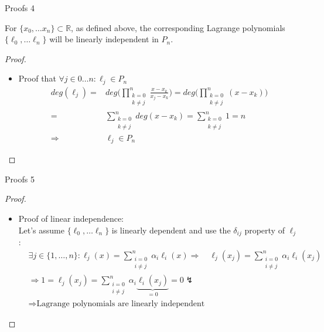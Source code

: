 \documentclass[8pt]{beamer}
\begin{document}
		\begin{frame}{Proofs 4}
			\begin{theorem}
				For $\{x_0, \ldots x_n \}\subset \mathbb{R}$, as defined above, the corresponding Lagrange polynomials $\{\ell_0, \ldots \ell_n \}$ will be linearly independent in $P_n$.
			\end{theorem}
			\begin{proof}
				\begin{itemize}
					\item 
					Proof that $\forall j \in 0\ldots n: \ell_j \in P_n$\\
					\begin{align*}
						\displaystyle deg(\ell_j) =& deg\bigg(\prod_{\substack{k= 0 \\ k \neq j }}^{n}\frac{x - x_k}{x_j - x_k}\bigg) =deg\bigg( \prod_{\substack{k= 0 \\ k \neq j }}^{n}(x-x_k)\bigg) \\=& \sum_{\substack{k= 0 \\ k \neq j }}^{n} deg(x-x_k) = \sum_{\substack{k= 0 \\ k \neq j }}^{n} 1 = n\\
						\Rightarrow& \ell_j \in P_n
					\end{align*}
				
				\end{itemize}
			\end{proof}
		\end{frame}
		\begin{frame}{Proofs 5}
			\begin{proof}
				\begin{itemize}
					\item Proof of linear independence:\\
					Let's assume $\{\ell_0, \ldots \ell_n \}$ is linearly dependent and use the $\delta_{ij}$ property of $\ell_j$:
					\begin{align*}
						&\exists j \in \{1, \ldots ,n \} : \ell_j(x) = \sum_{\substack{i= 0 \\ i \neq j }}^{n} \alpha_i \ell_i(x)
						\Rightarrow\quad  \ell_j(x_j) = \sum_{\substack{i= 0 \\ i \neq j }}^{n} \alpha_i \ell_i(x_j)\\
						&\Rightarrow 1 = \ell_j(x_j) = \sum_{\substack{i= 0 \\ i \neq j }}^{n} \alpha_i \underbrace{\ell_i(x_j)}_{=0} = 0 \lightning\\& \Rightarrow \text{Lagrange polynomials are linearly independent}
					\end{align*}
				\end{itemize}
			\end{proof}
		\end{frame}
									
\end{document}
